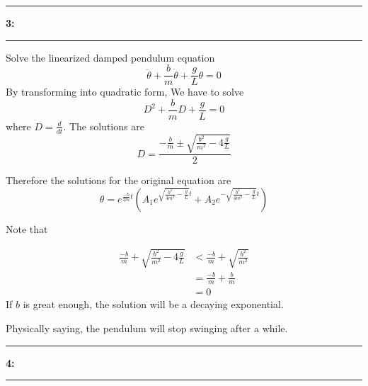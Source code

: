 \documentclass[11pt]{article}
\newcommand\question[2]{\vspace{.25in}\hrule\textbf{#1: #2}\vspace{.5em}\hrule\vspace{.10in}}
\begin{document}
\raggedright
\newcommand\NAME{Carl Kingsford}  %
\newcommand\ANDREWID{ckingsf}     %
\newcommand\HWNUM{1}              %



\question{3}{}
Solve the linearized damped pendulum equation
\begin{equation}
\ddot{\theta} + \frac{b}{m}\dot{\theta} + \frac{g}{L}\theta = 0
\end{equation}
By transforming into quadratic form, We have to solve 
\begin{equation}
    D^2 + \frac{b}{m}D + \frac{g}{L} = 0
\end{equation}
where $D = \frac{d}{dt}$. The solutions are
\begin{equation}
    D = \frac{-\frac{b}{m} \pm \sqrt{\frac{b^2}{m^2} - 4\frac{g}{L}}}{2}
\end{equation}

Therefore the solutions for the original equation are
\begin{equation}
    \theta = e^{\frac{-b}{2m}t} \left( A_1 e^{\sqrt{\frac{b^2}{4m^2} - \frac{g}{L}}t} + A_2 e^{-\sqrt{\frac{b^2}{4m^2} - \frac{g}{L}}t} \right)
\end{equation}

Note that 

\begin{align*}
    \frac{-b}{m} + \sqrt{\frac{b^2}{m^2} - 4\frac{g}{L}} &< \frac{-b}{m} + \sqrt{\frac{b^2}{m^2}} \\
    &= \frac{-b}{m} + \frac{b}{m} \\
    &= 0
\end{align*}
If $b$ is great enough, the solution will be a decaying exponential.

Physically saying, the pendulum will stop swinging after a while.

\question{4}{}
\end{document}
